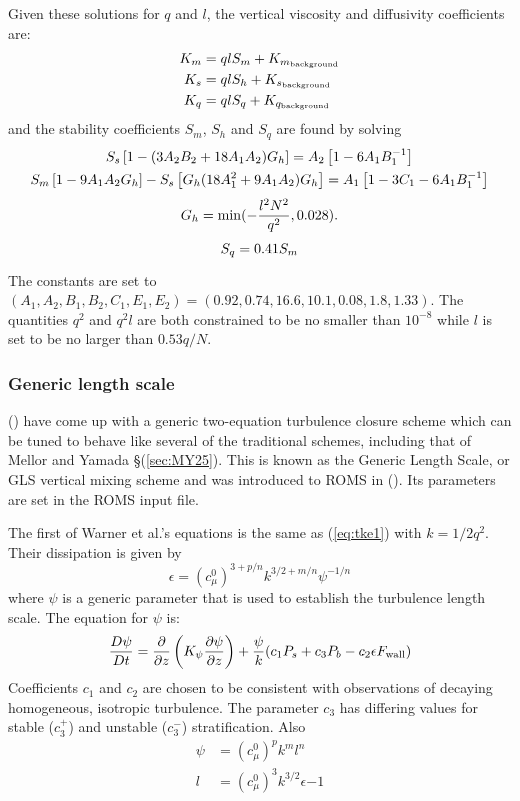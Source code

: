 Given these solutions for $q$ and $l$, the vertical viscosity and
diffusivity coefficients are:
\begin{align}
  K_m &= qlS_m + K_{m_{\rm background}} \\
  K_s &= qlS_h + K_{s_{\rm background}} \\
  K_q &= qlS_q + K_{q_{\rm background}}
\end{align}
and the stability coefficients $S_m$, $S_h$ and $S_q$ are found by
solving
\begin{gather}
  S_s \left[ 1 - (3A_2 B_2 + 18 A_1 A_2) G_h \right] =
  A_2 \left[ 1 - 6A_1 B_1^{-1} \right]
\\ \vspace{1mm}
  S_m \left[ 1 - 9A_1 A_2 G_h \right] - S_s \left[ G_h ( 18 A_1^2 +
  9A_1 A_2 ) G_h \right] =
  A_1 \left[ 1 - 3C_1 - 6A_1 B_1^{-1} \right]
\\ \vspace{1mm}
  G_h = \min ( -{l^2N^2 \over q^2}, 0.028 ).
\\ \vspace{1mm}
  S_q = 0.41 S_m
\end{gather}
The constants are set to $(A_1, A_2, B_1, B_2, C_1, E_1, E_2) = 
(0.92, 0.74, 16.6, 10.1, 0.08, 1.8, 1.33)$. The quantities $q^2$ and
$q^2l$ are both constrained to be no smaller than $10^{-8}$ while $l$
is set to be no larger than $0.53q/N$.

\subsubsection{Generic length scale}
(\cite{Umlauf2003}) have come up with a generic
two-equation turbulence closure scheme which can be tuned to behave
like several of the traditional schemes, including that of Mellor
and Yamada \S(\ref{sec:MY25}). This is known as the Generic Length
Scale, or GLS vertical mixing scheme and was introduced to ROMS in
(\cite{Warner_2005}). Its parameters are set in the
ROMS input file.

The first of Warner et al.'s equations is the same as (\ref{eq:tke1})
with $k=1/2 q^2$. Their dissipation is given by
\begin{equation}
  \epsilon = (c^0_\mu ) ^{3+p/n} k^{3/2+m/n} \psi ^{-1/n}
\end{equation}
where $\psi$ is a generic parameter that is used to establish the
turbulence length scale. The equation for $\psi$ is:
\begin{equation}
  {D \psi \over D t} = {\partial \over \partial z} \left( K_\psi  
  {\partial \psi \over \partial z}\right) + {\psi \over k}
  (c_1 P_s + c_3 P_b - c_2 \epsilon F_{\rm wall})
\end{equation}
Coefficients $c_1$ and $c_2$ are chosen to be consistent
with observations of decaying homogeneous, isotropic turbulence. The
parameter $c_3$ has differing values for stable ($c^+_3$) and unstable
($c^-_3$) stratification. Also
\begin{eqnarray}
   \psi &= (c^0_\mu)^p k^m l^n \\
   l &= (c^0_\mu)^3 k^{3/2} \epsilon{-1}
\end{eqnarray}

